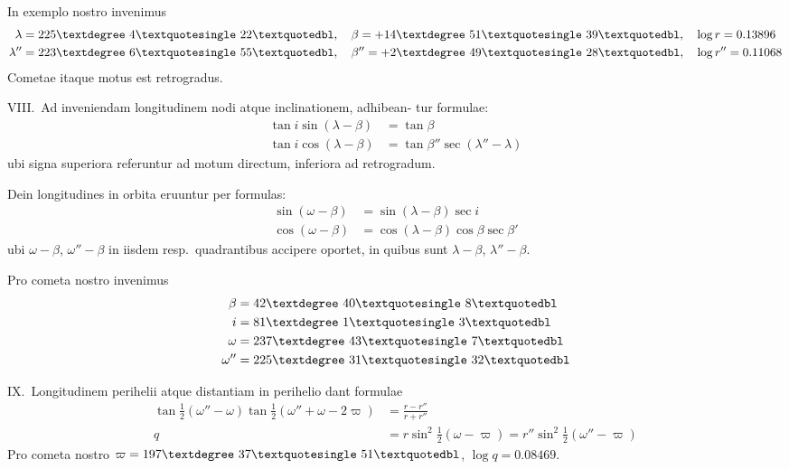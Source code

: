 \documentclass[12pt,a4paper]{article}
\begin{document}
In exemplo nostro invenimus
\begin{align*}
\lambda &= 225\textdegree\ 4\textquotesingle\ 22\textquotedbl, \quad \beta = +14\textdegree\ 51\textquotesingle\ 39\textquotedbl, \quad \log r = 0.13896 \\
\lambda'' &= 223\textdegree\ 6\textquotesingle\ 55\textquotedbl, \quad \beta'' = +2\textdegree\ 49\textquotesingle\ 28\textquotedbl, \quad \log r'' = 0.11068
\end{align*}
Cometae itaque motus est retrogradus.

VIII.\ Ad inveniendam longitudinem nodi atque inclinationem, adhibean-
tur formulae:
\begin{align*}
\tan i\sin(\lambda - \beta) &= \tan\beta \\
\tan i\cos(\lambda - \beta) &= \tan\beta''\sec(\lambda'' - \lambda)
\end{align*}
ubi signa superiora referuntur ad motum directum, inferiora ad retrogradum.

Dein longitudines in orbita eruuntur per formulas:
\begin{align*}
\sin(\omega - \beta) &= \sin(\lambda - \beta)\sec i \\
\cos(\omega - \beta) &= \cos(\lambda - \beta)\cos\beta\sec\beta'
\end{align*}
ubi $\omega - \beta$, $\omega'' - \beta$ in iisdem resp.\ quadrantibus accipere oportet, in quibus sunt
$\lambda - \beta$, $\lambda'' - \beta$.

Pro cometa nostro invenimus
\begin{align*}
\beta &= 42\textdegree\ 40\textquotesingle\ 8\textquotedbl \\
i &= 81\textdegree\ 1\textquotesingle\ 3\textquotedbl \\
\omega &= 237\textdegree\ 43\textquotesingle\ 7\textquotedbl \\
\omega'' &= 225\textdegree\ 31\textquotesingle\ 32\textquotedbl
\end{align*}

IX.\ Longitudinem perihelii atque distantiam in perihelio dant formulae
\begin{align*}
\tan\tfrac{1}{2}(\omega'' - \omega)\tan\tfrac{1}{2}(\omega'' + \omega - 2\varpi) &= \frac{r - r''}{r + r''} \\
q &= r\sin^2\tfrac{1}{2}(\omega - \varpi) = r''\sin^2\tfrac{1}{2}(\omega'' - \varpi)
\end{align*}
Pro cometa nostro $\varpi = 197\textdegree\ 37\textquotesingle\ 51\textquotedbl$, $\log q = 0.08469$.
\end{document}
